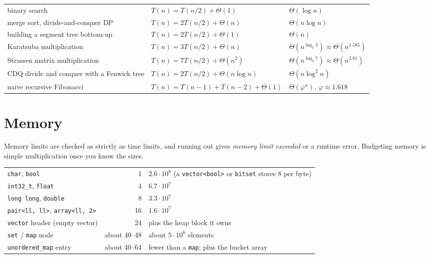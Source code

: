 \begin{center}
\small
\begin{tabularx}{\linewidth}{Lll}
\toprule
{} &  &  \\
\midrule
binary search & $T(n) = T(n/2) + \Theta(1)$ & $\Theta(\log n)$ \\
merge sort, divide-and-conquer DP & $T(n) = 2T(n/2) + \Theta(n)$ & $\Theta(n \log n)$ \\
building a segment tree bottom-up & $T(n) = 2T(n/2) + \Theta(1)$ & $\Theta(n)$ \\
Karatsuba multiplication & $T(n) = 3T(n/2) + \Theta(n)$ & $\Theta(n^{\log_2 3}) \approx \Theta(n^{1.585})$ \\
Strassen matrix multiplication & $T(n) = 7T(n/2) + \Theta(n^2)$ & $\Theta(n^{\log_2 7}) \approx \Theta(n^{2.81})$ \\
CDQ divide and conquer with a Fenwick tree & $T(n) = 2T(n/2) + \Theta(n \log n)$ & $\Theta(n \log^2 n)$ \\
naive recursive Fibonacci & $T(n) = T(n-1) + T(n-2) + \Theta(1)$ & $\Theta(\varphi^n)$, $\varphi \approx 1.618$ \\
\bottomrule
\end{tabularx}
\end{center}

\section[Memory]{Memory \hfill \bronze}\label{sec:memory}

Memory limits are checked as strictly as time limits, and running out gives \emph{memory limit exceeded} or a runtime error.
Budgeting memory is simple multiplication once you know the sizes.

\begin{center}
\small
\begin{tabularx}{\linewidth}{lrL}
\toprule
{} &  &  \\
\midrule
\texttt{char}, \texttt{bool} & 1 & $2.6\cdot 10^8$ (a \texttt{vector<bool>} or \texttt{bitset} stores 8 per byte) \\
\texttt{int32\_t}, \texttt{float} & 4 & $6.7\cdot 10^7$ \\
\texttt{long long}, \texttt{double} & 8 & $3.3\cdot 10^7$ \\
\texttt{pair<ll, ll>}, \texttt{array<ll, 2>} & 16 & $1.6\cdot 10^7$ \\
\texttt{vector} header (empty vector) & 24 & plus the heap block it owns \\
\texttt{set} / \texttt{map} node & about 40--48 & about $5\cdot 10^6$ elements \\
\texttt{unordered\_map} entry & about 40--64 & fewer than a \texttt{map}; plus the bucket array \\
\bottomrule
\end{tabularx}
\end{center}


